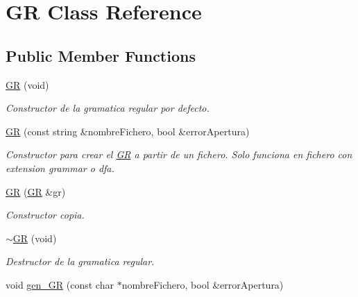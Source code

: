 \hypertarget{class_g_r}{}\section{GR Class Reference}
\label{class_g_r}
\subsection*{Public Member Functions}
\begin{DoxyCompactItemize}
\item 
\mbox{\label{class_g_r_a44cfd47b23f3a406312fc79165459e9d}} 
\hyperlink{class_g_r_a44cfd47b23f3a406312fc79165459e9d}{GR} (void)
\begin{DoxyCompactList}\small\item\em Constructor de la gramatica regular por defecto. \end{DoxyCompactList}\item 
\hyperlink{class_g_r_a1e1fb0154f48d7787c58965d144edce0}{GR} (const string \&nombre\+Fichero, bool \&error\+Apertura)
\begin{DoxyCompactList}\small\item\em Constructor para crear el \hyperlink{class_g_r}{GR} a partir de un fichero. Solo funciona en fichero con extension \textquotesingle{}grammar\textquotesingle{} o \textquotesingle{}dfa\textquotesingle{}. \end{DoxyCompactList}\item 
\hyperlink{class_g_r_a47a0d1db1ac52d4b745c22d717645577}{GR} (\hyperlink{class_g_r}{GR} \&gr)
\begin{DoxyCompactList}\small\item\em Constructor copia. \end{DoxyCompactList}\item 
\mbox{\label{class_g_r_a60a1df45425dce1a14e0ad5b8677b8fa}} 
\hyperlink{class_g_r_a60a1df45425dce1a14e0ad5b8677b8fa}{$\sim$\+GR} (void)
\begin{DoxyCompactList}\small\item\em Destructor de la gramatica regular. \end{DoxyCompactList}\item 
\mbox{\label{class_g_r_aa621faa9150e57848b3b2b11a52c4fa5}} 
void \hyperlink{class_g_r_aa621faa9150e57848b3b2b11a52c4fa5}{gen\+\_\+\+GR} (const char $\ast$nombre\+Fichero, bool \&error\+Apertura)

\end{DoxyCompactItemize}
